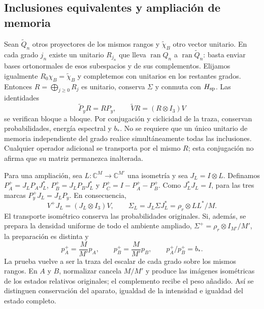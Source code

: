 \subsection{Inclusiones equivalentes y ampliación de memoria}
\label{subsec:ii-tins-inclusiones}

Sean $\widetilde Q_n$ otros proyectores de los mismos rangos y
$\widetilde \chi_B$ otro vector unitario. En cada grado $j_n$ existe un unitario
$R_{j_n}$ que lleva $\operatorname{ran}Q_n$ a
$\operatorname{ran}\widetilde Q_n$: basta enviar bases ortonormales de esos
subespacios y de sus complementos. Elijamos igualmente $R_0\chi_B=\widetilde \chi_B$
y completemos con unitarios en los restantes grados. Entonces
$R=\bigoplus_{j\ge0}R_j$ es unitario, conserva $\Sigma$ y conmuta con
$H_{\rm sp}$. Las identidades
\begin{equation}
 \widetilde P_yR=RP_y,\qquad
 \widetilde V R=(R\otimes I_3)V
 \label{eq:ii-tins-inclusion}
\end{equation}
se verifican bloque a bloque. Por conjugación y ciclicidad de la traza,
conservan probabilidades, energía espectral y $b_*$. No se requiere que un
único unitario de memoria independiente del grado realice simultáneamente
todas las inclusiones. Cualquier operador adicional se transporta por el
mismo $R$; esta conjugación no afirma que su matriz permanezca inalterada.

Para una ampliación, sea $L:\mathbb C^M\to\mathbb C^{M'}$ una isometría
y sea $J_L=I\otimes L$. Definamos
$P_A^+=J_LP_AJ_L^*$, $P_B^+=J_LP_BJ_L^*$ y
$P_C^+=I-P_A^+-P_B^+$. Como $J_L^*J_L=I$, para las tres marcas
$P_y^+J_L=J_LP_y$. En consecuencia,
\begin{equation}
 V^+J_L=(J_L\otimes I_3)V,
 \qquad \Sigma_L=J_L\Sigma J_L^*=\rho_r\otimes LL^*/M.
 \label{eq:ii-tins-extension}
\end{equation}
El transporte isométrico conserva las probabilidades originales.
Si, además, se prepara la densidad uniforme de todo el ambiente ampliado,
$\Sigma^+=\rho_r\otimes I_{M'}/M'$, la preparación es distinta y
\begin{equation}
 p_A^+=\frac{M}{M'}p_A,\qquad
 p_B^+=\frac{M}{M'}p_B,\qquad p_A^+/p_B^+=b_*.
 \label{eq:ii-tins-uniform-extension}
\end{equation}
La prueba vuelve a ser la traza del escalar de cada grado sobre los mismos
rangos. En $A$ y $B$, normalizar cancela $M/M'$ y produce las imágenes
isométricas de los estados relativos originales; el complemento recibe el
peso añadido. Así se distinguen conservación del aparato, igualdad de la
intensidad e igualdad del estado completo.

